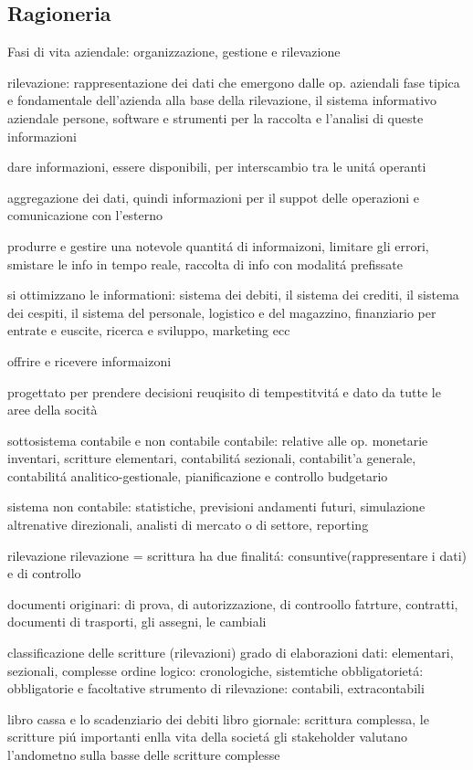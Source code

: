 \documentclass{article}
\begin{document}
\subsection{Ragioneria}
Fasi di vita aziendale: organizzazione, gestione e rilevazione

rilevazione: rappresentazione dei dati che emergono dalle op. aziendali
fase tipica e fondamentale dell'azienda
alla base della rilevazione, il sistema informativo aziendale
persone, software e strumenti per la raccolta e l'analisi di queste informazioni

dare informazioni, essere disponibili, per interscambio tra le unit\'a operanti

aggregazione dei dati, quindi informazioni per il suppot delle operazioni e comunicazione con l'esterno

produrre e gestire una notevole quantit\'a di informaizoni, limitare gli errori, smistare le info in tempo reale, raccolta di info con modalit\'a prefissate

si ottimizzano le informationi: sistema dei debiti, il sistema dei crediti, il sistema dei cespiti, il sistema del personale, logistico e del magazzino, finanziario per entrate e euscite, ricerca e sviluppo, marketing ecc

offrire e ricevere informaizoni

progettato per prendere decisioni
reuqisito di tempestitvit\'a e dato da tutte le aree della socità

sottosistema contabile e non contabile
contabile: relative alle op. monetarie
inventari, scritture elementari, contabilit\'a sezionali, contabilit'a generale, contabilit\'a analitico-gestionale, pianificazione e controllo budgetario

sistema non contabile: statistiche, previsioni andamenti futuri, simulazione altrenative direzionali, analisti di mercato o di settore, reporting

rilevazione
rilevazione = scrittura
ha due finalit\'a: consuntive(rappresentare i dati) e di controllo

documenti originari: di prova, di autorizzazione, di controollo
fatrture, contratti, documenti di trasporti, gli assegni, le cambiali

classificazione delle scritture (rilevazioni)
grado di elaborazioni dati: elementari, sezionali, complesse
ordine logico: cronologiche, sistemtiche
obbligatoriet\'a: obbligatorie e facoltative
strumento di rilevazione: contabili, extracontabili

libro cassa e lo scadenziario dei debiti
libro giornale: scrittura complessa, le scritture pi\'u importanti enlla vita della societ\'a
gli stakeholder valutano l'andometno sulla basse delle scritture complesse
\end{document}
